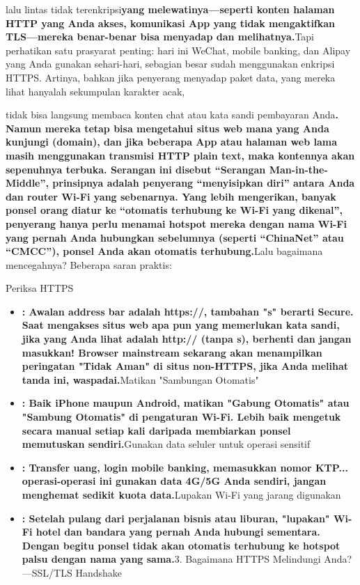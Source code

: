lalu lintas tidak terenkripsi\textbf{yang melewatinya—seperti konten halaman HTTP yang Anda akses, komunikasi App yang tidak mengaktifkan TLS—mereka benar-benar bisa menyadap dan melihatnya.}Tapi perhatikan satu prasyarat penting: hari ini WeChat, mobile banking, dan Alipay yang Anda gunakan sehari-hari, sebagian besar sudah menggunakan enkripsi HTTPS. Artinya, bahkan jika penyerang menyadap paket data, yang mereka lihat hanyalah sekumpulan karakter acak,

tidak bisa langsung membaca konten chat atau kata sandi pembayaran Anda\textbf{. Namun mereka tetap bisa mengetahui situs web mana yang Anda kunjungi (domain), dan jika beberapa App atau halaman web lama masih menggunakan transmisi HTTP plain text, maka kontennya akan sepenuhnya terbuka. Serangan ini disebut “Serangan Man-in-the-Middle”, prinsipnya adalah penyerang “menyisipkan diri” antara Anda dan router Wi-Fi yang sebenarnya. Yang lebih mengerikan, banyak ponsel orang diatur ke “otomatis terhubung ke Wi-Fi yang dikenal”, penyerang hanya perlu menamai hotspot mereka dengan nama Wi-Fi yang pernah Anda hubungkan sebelumnya (seperti “ChinaNet” atau “CMCC”), ponsel Anda akan otomatis terhubung.}Lalu bagaimana mencegahnya? Beberapa saran praktis:

Periksa HTTPS

\begin{itemize}
  \item \textbf{: Awalan address bar adalah https://, tambahan "s" berarti Secure. Saat mengakses situs web apa pun yang memerlukan kata sandi, jika yang Anda lihat adalah http:// (tanpa s), berhenti dan jangan masukkan! Browser mainstream sekarang akan menampilkan peringatan "Tidak Aman" di situs non-HTTPS, jika Anda melihat tanda ini, waspadai.}Matikan "Sambungan Otomatis"
  \item \textbf{: Baik iPhone maupun Android, matikan "Gabung Otomatis" atau "Sambung Otomatis" di pengaturan Wi-Fi. Lebih baik mengetuk secara manual setiap kali daripada membiarkan ponsel memutuskan sendiri.}Gunakan data seluler untuk operasi sensitif
  \item \textbf{: Transfer uang, login mobile banking, memasukkan nomor KTP... operasi-operasi ini gunakan data 4G/5G Anda sendiri, jangan menghemat sedikit kuota data.}Lupakan Wi-Fi yang jarang digunakan
  \item \textbf{: Setelah pulang dari perjalanan bisnis atau liburan, "lupakan" Wi-Fi hotel dan bandara yang pernah Anda hubungi sementara. Dengan begitu ponsel tidak akan otomatis terhubung ke hotspot palsu dengan nama yang sama.}3. Bagaimana HTTPS Melindungi Anda?—SSL/TLS Handshake
\end{itemize}

